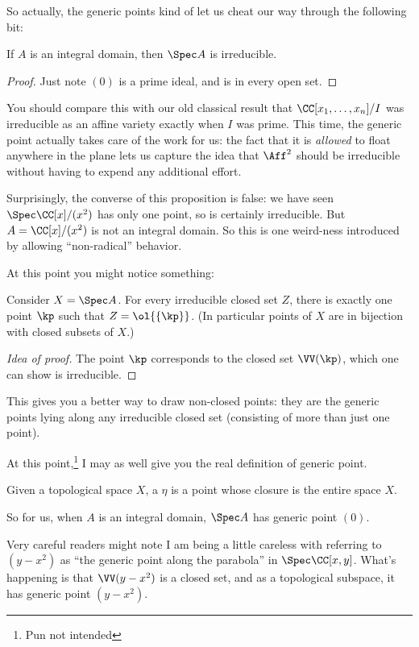 So actually, the generic points
kind of let us cheat our way through the following bit:
\begin{proposition}
	If $A$ is an integral domain,
	then $\Spec A$ is irreducible.
\end{proposition}
\begin{proof}
	Just note $(0)$ is a prime ideal,
	and is in every open set.
\end{proof}
You should compare this with our old classical result that
$\CC[x_1, \dots, x_n]/I$
was irreducible as an affine variety exactly when $I$ was prime.
This time, the generic point actually takes care
of the work for us:
the fact that it is \emph{allowed} to float
anywhere in the plane lets us capture the idea that
$\Aff^2$ should be irreducible
without having to expend any additional effort.
\begin{remark}
	Surprisingly, the converse of this proposition is false:
	we have seen $\Spec \CC[x]/(x^2)$ has only one point,
	so is certainly irreducible.
	But $A = \CC[x]/(x^2)$ is not an integral domain.
	So this is one weird-ness introduced by allowing ``non-radical'' behavior.
\end{remark}

At this point you might notice something:
\begin{theorem}
	Consider $X = \Spec A$.
	For every irreducible closed set $Z$,
	there is exactly one point $\kp$ such that $Z = \ol{\{\kp\}}$.
	(In particular points of $X$ are in bijection
	with closed subsets of $X$.)
\end{theorem}
\begin{proof}
	[Idea of proof]
	The point $\kp$ corresponds to the closed set $\VV(\kp)$,
	which one can show is irreducible.
\end{proof}
This gives you a better way to draw non-closed points:
they are the generic points lying along any irreducible closed set
(consisting of more than just one point).

At this point,\footnote{Pun not intended}
I may as well give you the real definition of generic point.
\begin{definition}
	Given a topological space $X$,
	a  $\eta$
	is a point whose closure is the entire space $X$.
\end{definition}
So for us, when $A$ is an integral domain,
$\Spec A$ has generic point $(0)$.
\begin{abuse}
	Very careful readers might note I am being a little careless
	with referring to $(y-x^2)$ as
	``the generic point along the parabola''
	in $\Spec \CC[x,y]$.
	What's happening is that $\VV(y-x^2)$ is a closed set,
	and as a topological subspace, it has generic point $(y-x^2)$.
\end{abuse}

